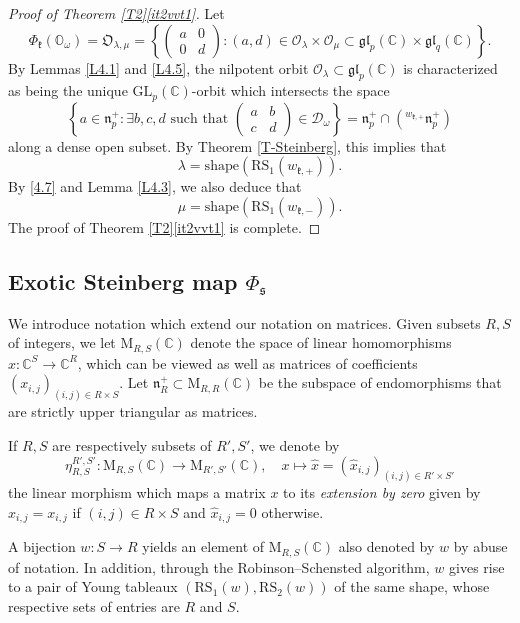 \documentclass[11pt]{article}
\theoremstyle{definition}
\numberwithin{equation}{section}
\newcommand{\fk}{\mathfrak{k}}
\newcommand{\fs}{\mathfrak{s}}
\newcommand{\fn}{\mathfrak{n}}
\newcommand{\gl}{\mathfrak{gl}}
\newcommand{\RS}{\mathrm{RS}}
\newcommand{\shape}{\mathrm{shape}}
\newcommand{\Mat}{\mathrm{M}}
\newcommand{\Xorbit}{\mathbb{O}}
\newcommand{\Nkorbit}{\mathfrak{O}}
\newcommand{\condir}{\mathcal{D}}
\newcommand{\GL}{\mathrm{GL}}
\newcommand{\mC}{\mathbb{C}}
\begin{document}
\begin{proof}[Proof of Theorem \ref{T2}\ref{it2vvt1}]
Let
\[\Phi_\fk(\Xorbit_\omega)=\Nkorbit_{\lambda,\mu}=\left\{\begin{pmatrix} a & 0\\ 0 & d \end{pmatrix}:(a,d)\in\mathcal{O}_\lambda\times\mathcal{O}_\mu\subset\gl_p(\mC)\times\gl_q(\mC)\right\}.\]
By Lemmas \ref{L4.1} and \ref{L4.5}, the nilpotent orbit $\mathcal{O}_\lambda\subset\gl_p(\mC)$ is characterized as being the unique $\GL_p(\mC)$-orbit which intersects the space
\[\left\{a\in\fn_p^+:\exists b,c,d\mbox{ such that }\begin{pmatrix} a & b\\ c & d \end{pmatrix}\in\condir_\omega\right\}=\fn_p^+\cap({}^{w_{\fk,+}}\fn_p^+)\]
along a dense open subset. By Theorem \ref{T-Steinberg}, this implies that
\[\lambda=\shape(\RS_1(w_{\fk,+})).\]
By \eqref{4.7} and Lemma \ref{L4.3}, we also deduce that
\[\mu=\shape(\RS_1(w_{\fk,-})).\]
The proof of Theorem \ref{T2}\ref{it2vvt1} is complete.
\end{proof}

\subsection{Exotic Steinberg map $\Phi_\fs$}

We introduce notation which extend our notation on matrices.
Given subsets $R,S$ of integers, we let $\Mat_{R,S}(\mC)$ denote the space of linear homomorphisms $x:\mC^S\to \mC^R$, which can be viewed as well as matrices of coefficients $(x_{i,j})_{(i,j)\in R\times S}$.
Let $\fn_R^+\subset\Mat_{R,R}(\mC)$ be the subspace of endomorphisms that are strictly upper triangular as matrices. %

If $R,S$ are respectively subsets of $R',S'$, we denote by
\begin{equation}
\label{eta}
\eta_{R,S}^{R',S'}:\Mat_{R,S}(\mC)\to\Mat_{R',S'}(\mC),\quad x\mapsto \hat{x}=(\hat{x}_{i,j})_{(i,j)\in R'\times S'}
\end{equation}
the linear morphism which maps a matrix $x$ to its {\em extension by zero} given by
$\hat{x}_{i,j}=x_{i,j}$ if $(i,j)\in R\times S$ and $\hat{x}_{i,j}=0$ otherwise.

A bijection $w:S\to R$ yields an element of $\Mat_{R,S}(\mC)$ also denoted by $w$ by abuse of notation. In addition, through the Robinson--Schensted algorithm, $w$ gives rise to a pair of Young tableaux $(\RS_1(w),\RS_2(w))$ of the same shape, whose respective sets of entries are $R$ and $S$.
\end{document}
